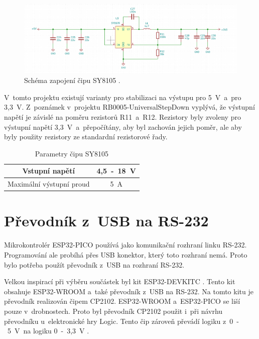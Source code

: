   \begin{figure}[!h]
    \begin{center}
      \includegraphics[scale=0.4]{obrazky/SY8105_schema.png}
    \end{center}
    \caption[Schéma zapojení čipu SY8105 \cite{SY8105_datasheet} \cite{UniversalStepDown}]{Schéma zapojení čipu SY8105 
    \cite{SY8105_datasheet} \cite{UniversalStepDown}.}
  \end{figure}


  V~tomto projektu existují varianty pro stabilizaci na výstupu pro 5~V~a~pro 3,3~V. Z~poznámek v~projektu RB0005-UniversalStepDown 
  vyplývá, že výstupní napětí je závislé na poměru rezistorů R11~a~R12. Rezistory byly zvoleny pro výstupní napětí 3,3~V~a~přepočítány, 
  aby byl zachován jejich poměr, ale aby byly použity rezistory ze standardní rezistorové řady.

  \begin{table}[!h]
    \caption{Parametry čipu SY8105 \cite{SY8105_datasheet}}
    \begin{center}
        \begin{tabular}{|c|c|}
            \hline
            Vstupní napětí             & 4,5~-~18~V \\ 
            \hline
            Maximální výstupní proud   & 5~A \\
            \hline
        \end{tabular}    
    \end{center}
\end{table}

  \section{Převodník z~USB na RS-232}
  Mikrokontrolér ESP32-PICO používá jako komunikační rozhraní linku RS-232. Programování ale probíhá přes USB konektor, který toto rozhraní
  nemá. Proto bylo potřeba použít převodník z~USB na rozhraní RS-232.
  
  Velkou inspirací při výběru součástek byl kit ESP32-DEVKITC \cite{Devkit_schema}. Tento kit obsahuje ESP32-WROOM a~také převodník
  z~USB na RS-232. Na tomto kitu je převodník realizován čipem CP2102. ESP32-WROOM a~ESP32-PICO se liší pouze v~drobnostech. 
  Proto byl převodník CP2102 použit i~při návrhu převodníku u~elektronické hry Logic.  Tento čip zároveň převádí logiku 
  z~0~-~5~V~na logiku 0~-~3,3~V \cite{CP2102_datasheet}. 

